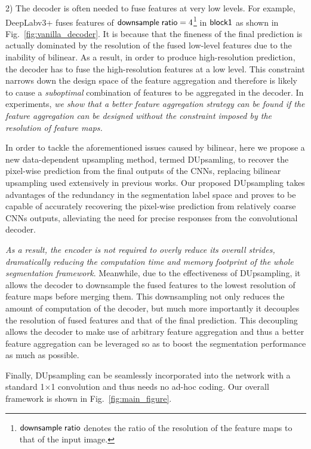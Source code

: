 \documentclass[10pt,twocolumn,letterpaper]{article}
\newcommand{\1}{{\mathbbm{1}}}
\begin{document}
2) The decoder is often needed  to fuse features at  very low levels. For example, DeepLabv3+ fuses features of ${\sf downsample \; ratio} = 4$\footnote{$\sf downsample \; ratio$ denotes the ratio of the resolution of the feature maps to that of the input image.} in
  $\sf block1$ as shown in Fig.~\ref{fig:vanilla_decoder}. It is because that the fineness of the final prediction is actually dominated by the resolution of the fused low-level features due to the inability of bilinear. As a result, in order to produce high-resolution prediction, the decoder has to fuse the high-resolution features at a low level. This constraint narrows down the design space of the feature aggregation and therefore is likely to cause a {\it suboptimal} combination of features to be aggregated  in the decoder. In experiments, {\em we show that a better feature aggregation strategy can be found if the feature aggregation can be designed without the constraint imposed by the resolution of feature maps.
}



In order to tackle the aforementioned issues caused by bilinear, here we propose a new data-dependent upsampling method, termed DUpsamling,
to recover the pixel-wise prediction from the final outputs of the CNNs, replacing bilinear upsampling used extensively in previous works. Our proposed DUpsampling takes advantages of the redundancy in the segmentation label space and proves to be capable of accurately recovering the pixel-wise prediction from relatively coarse CNNs outputs, alleviating the need for precise responses from the convolutional decoder.

{\em As a result, the encoder is not required to overly reduce its overall strides, dramatically reducing the computation time and memory footprint of the whole segmentation framework}. Meanwhile, due to the effectiveness of DUpsampling, it allows the decoder to downsample the fused features to the lowest resolution of feature maps before merging them. This downsampling not only reduces the amount of computation of the decoder, but much more importantly it decouples the resolution of fused features and that of the final prediction. This decoupling allows the decoder to make use of arbitrary  feature aggregation and thus a better feature aggregation can be leveraged so as to boost the  segmentation performance as much as possible.

Finally, DUpsampling can be seamlessly incorporated into the network with a standard 1$\times$1 convolution and thus needs no ad-hoc coding. Our overall framework is shown in Fig.~\ref{fig:main_figure}.
\end{document}
